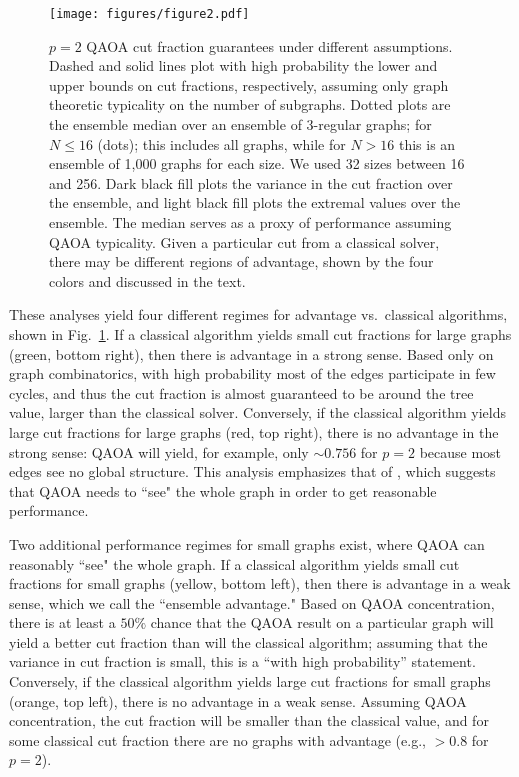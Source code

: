 \documentclass[prb,reprint,nofootinbib,longbibliography,superscriptaddress]{revtex4-1}
\begin{document}
\quad


\begin{figure}
    \centering
    \texttt{[image: figures/figure2.pdf]}
    \caption{$p=2$ QAOA cut fraction guarantees under different assumptions. Dashed and solid lines plot with high probability the lower and upper bounds on cut fractions, respectively, assuming only graph theoretic typicality on the number of subgraphs. Dotted plots are the ensemble median over an ensemble of 3-regular graphs; for $N\leq 16$ (dots); this includes all graphs, while for $N>16$ this is an ensemble of 1,000 graphs for each size. We used 32 sizes between 16 and 256. Dark black fill plots the variance in the cut fraction over the ensemble, and light black fill plots the extremal values over the ensemble. The median serves as a proxy of performance assuming QAOA typicality. Given a particular cut from a classical solver, there may be different regions of advantage, shown by the four colors and discussed in the text.}
    \label{fig:bounds_p1}
\end{figure}


These analyses yield four different regimes for advantage vs.~classical algorithms, shown in Fig.~\ref{fig:bounds_p1}. If a classical algorithm yields small cut fractions for large graphs (green, bottom right), then there is advantage in a strong sense. Based only on graph combinatorics, with high probability most of the edges participate in few cycles, and thus the cut fraction is almost guaranteed to be around the tree value, larger than the classical solver. Conversely, if the classical algorithm yields large cut fractions for large graphs (red, top right), there is no advantage in the strong sense: QAOA will  yield, for example, only $\sim 0.756$ for $p=2$ because most edges see no global structure. This analysis emphasizes that of \cite{farhi2020quantum}, which suggests that QAOA needs to ``see" the whole graph in order to get reasonable performance.

Two additional performance regimes for small graphs exist, where QAOA can reasonably ``see" the whole graph. If a classical algorithm yields small cut fractions for small graphs (yellow, bottom left), then there is advantage in a weak sense, which we call the ``ensemble advantage." Based on QAOA concentration, there is at least a $50\%$ chance that the QAOA result on a particular graph will yield a better cut fraction than will the classical algorithm; assuming that the variance in cut fraction is small, this is a ``with high probability'' statement. Conversely, if the classical algorithm yields large cut fractions for small graphs (orange, top left), there is no advantage in a weak sense. Assuming QAOA concentration, the cut fraction will be smaller than the classical value, and for some classical cut fraction there are no graphs with advantage (e.g., $>0.8$ for $p=2$).
\end{document}
